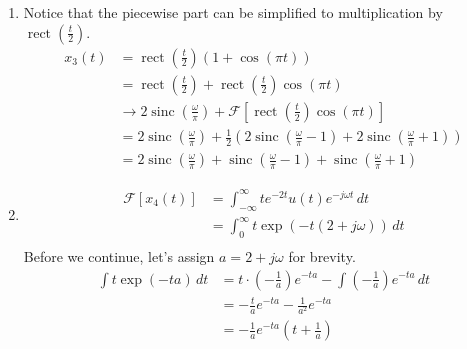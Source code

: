 \documentclass[12pt]{article}
\newcommand{\rect}{\operatorname{rect}}
\newcommand{\sinc}{\operatorname{sinc}}
\begin{document}
\begin{enumerate}
\begin{enumerate}
\begin{enumerate}
                              \item Notice that the piecewise part can be simplified to multiplication by $\rect\left(\frac{t}{2}\right)$.
                                    \begin{align*}
                                          x_3(t)
                                           & = \rect\left(\frac{t}{2}\right)(1+\cos(\pi t))                                                                                                 \\
                                           & = \rect\left(\frac{t}{2}\right)+\rect\left(\frac{t}{2}\right)\cos(\pi t)                                                                       \\
                                           & \rightarrow 2\sinc\left(\frac{\omega}{\pi}\right)+\mathcal{F}\left[\rect\left(\frac{t}{2}\right)\cos(\pi t)\right]                               \\
                                           & =2\sinc\left(\frac{\omega}{\pi}\right)+\frac{1}{2}\left(2\sinc\left(\frac{\omega}{\pi}-1\right)+2\sinc\left(\frac{\omega}{\pi}+1\right)\right) \\
                                           & =\boxed{2\sinc\left(\frac{\omega}{\pi}\right)+\sinc\left(\frac{\omega}{\pi}-1\right)+\sinc\left(\frac{\omega}{\pi}+1\right)}
                                    \end{align*}
                              \item \[\begin{aligned}
                                                \mathcal{F}[x_4(t)]
                                                 & = \int_{-\infty}^{\infty} te^{-2t}u(t)e^{-j\omega t}\,dt \\
                                                 & = \int_{0}^{\infty} t\exp(-t(2+j\omega))\,dt             \\
                                          \end{aligned}\]
                                    Before we continue, let's assign $a=2+j\omega$ for brevity.
                                    \begin{align*}
                                          \int t\exp(-ta)\,dt
                                          &= t \cdot \left(-\frac{1}{a}\right)e^{-ta}-\int \left(-\frac{1}{a}\right)e^{-ta}\,dt \\
                                          &= -\frac{t}{a}e^{-ta}-\frac{1}{a^2}e^{-ta} \\
                                          &= -\frac{1}{a}e^{-ta}\left(t+\frac{1}{a}\right)
                                    \end{align*}


\end{enumerate}
\end{enumerate}
\end{enumerate}
\end{document}
